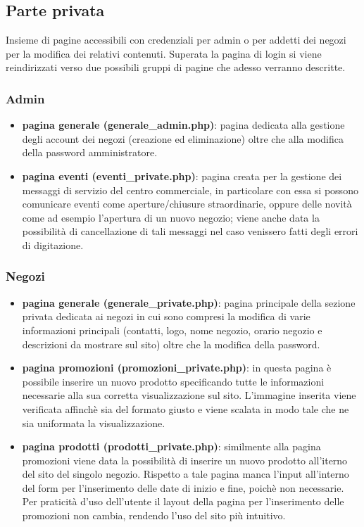 \documentclass[a4paper,12pt]{article}
\begin{document}
\subsection{Parte privata}
Insieme di pagine accessibili con credenziali per admin o per addetti dei negozi per la modifica dei relativi contenuti. Superata la pagina di login si viene reindirizzati verso due possibili gruppi di pagine che adesso verranno descritte.
\subsubsection{Admin}
\begin{itemize}
	\item \textbf{pagina generale (generale\_admin.php)}: pagina dedicata alla gestione degli account dei negozi (creazione ed eliminazione) oltre che alla modifica della password amministratore.
	\item \textbf{pagina eventi (eventi\_private.php)}: pagina creata per la gestione dei messaggi di servizio del centro commerciale, in particolare con essa si possono comunicare eventi come aperture/chiusure straordinarie, oppure delle novità come ad esempio l'apertura di un nuovo negozio; viene anche data la possibilità di cancellazione di tali messaggi nel caso venissero fatti degli errori di digitazione.
\end{itemize}
\subsubsection{Negozi}
\begin{itemize}
	\item \textbf{pagina generale (generale\_private.php)}: pagina principale della sezione privata dedicata ai negozi in cui sono compresi la modifica di varie informazioni principali (contatti, logo, nome negozio, orario negozio e descrizioni da mostrare sul sito) oltre che la modifica della password.
	\item \textbf{pagina promozioni (promozioni\_private.php)}: in questa pagina è possibile inserire un nuovo prodotto specificando tutte le informazioni necessarie alla sua corretta visualizzazione sul sito. L'immagine inserita viene verificata affinchè sia del formato giusto e viene scalata in modo tale che ne sia uniformata la visualizzazione.
	\item \textbf{pagina prodotti (prodotti\_private.php)}: similmente alla pagina promozioni viene data la possibilità di inserire un nuovo prodotto all'iterno del sito del singolo negozio. Rispetto a tale pagina manca l'input all'interno del form per l'inserimento delle date di inizio e fine, poichè non necessarie. Per praticità d'uso dell'utente il layout della pagina per l'inserimento delle promozioni non cambia, rendendo l'uso del sito più intuitivo.
	
\end{itemize}
\end{document}
